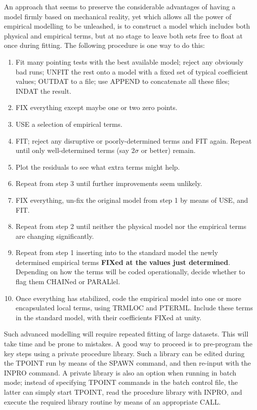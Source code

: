 An approach that seems to preserve the considerable advantages
of having a model firmly based on mechanical reality, yet which
allows all the power of empirical modelling to be unleashed, is
to construct a model which includes both
physical and empirical terms, but at no stage to
leave both sets free to float at once during fitting.  The
following procedure is one way to do this:
\begin{enumerate}
\item Fit many pointing tests with the best available model;
reject any obviously bad runs; UNFIT the rest onto a
model with a fixed set of typical coefficient values;  OUTDAT to a file;
use APPEND to concatenate all these files;  INDAT the
result.
\item FIX everything except maybe one or two zero points.
\item USE a selection of empirical terms.
\item FIT; reject any disruptive or poorly-determined terms and FIT again.
Repeat until only well-determined terms (say $2\sigma$ or better) remain.
\item Plot the residuals to see what extra terms might help.
\item Repeat from step 3 until further improvements seem unlikely.
\item FIX everything, un-fix the original model from step 1
by means of USE, and FIT.
\item Repeat from step 2 until neither the physical model nor the
empirical terms are changing significantly.
\item Repeat from step 1 inserting into to the standard model the
newly determined empirical terms {\bf FIXed at the values just
determined}.  Depending on how the terms will be coded
operationally, decide whether to flag them CHAINed or PARALlel.
\item Once everything has stabilized, code the empirical model
into one or more encapsulated local terms, using TRMLOC and
PTERML.  Include these terms in the standard model, with
their coefficients FIXed at unity.
\end{enumerate}

Such advanced modelling will require repeated fitting of large
datasets.  This will take time and be prone to mistakes.  A good way
to proceed is to pre-program the
key steps using a private procedure library.
Such a library can be edited during the TPOINT run by means of the
SPAWN command, and then re-input with the INPRO command.  A
private library is also an option when running in batch mode;
instead of specifying TPOINT commands in the batch control
file, the latter can simply start TPOINT, read the procedure
library with INPRO, and execute the required library routine by
means of an appropriate CALL.

